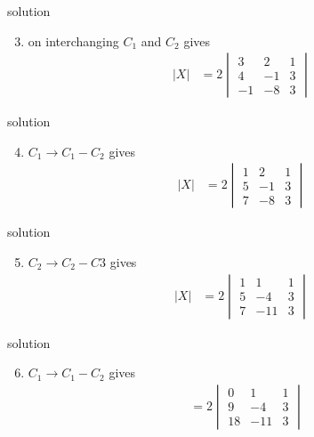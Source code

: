 \documentclass{beamer}
\begin{document}
\begin{frame}{solution}
\begin{enumerate}
\setcounter{enumi}{2}
\item on interchanging $C_1$ and $C_2$ gives
\begin{align}
        |X| & = 2\begin{vmatrix}
                3 & 2 & 1\\
                4 & -1 & 3\\
                -1 & -8 & 3
            \end{vmatrix}
\end{align}
\end{enumerate}
\end{frame}

 
\begin{frame}{solution}
\begin{enumerate}
\setcounter{enumi}{3}
\item $C_1\longrightarrow C_1-C_2$ gives
\begin{align}
        |X| & = 2\begin{vmatrix}
                1 & 2 & 1\\
                5 & -1 & 3\\
                7 & -8 & 3
           \end{vmatrix}
           \end{align}
\end{enumerate}
\end{frame}


\begin{frame}{solution}
\begin{enumerate}
\setcounter{enumi}{4}
\item $C_2\longrightarrow C_2-C3$ gives
\begin{align}
        |X| & = 2\begin{vmatrix}
                1 & 1 & 1\\
                5 & -4 & 3\\
                7 & -11 & 3
               \end{vmatrix}
\end{align}
\end{enumerate}
\end{frame}


\begin{frame}{solution}
\begin{enumerate}
\setcounter{enumi}{5}
\item $C_1\longrightarrow C_1-C_2$ gives
\begin{align}
           & = 2\begin{vmatrix}
               0 & 1 & 1\\
               9 & -4 & 3\\
               18 & -11 & 3
               \end{vmatrix}
\end{align}
\end{enumerate}
\end{frame}
\end{document}
